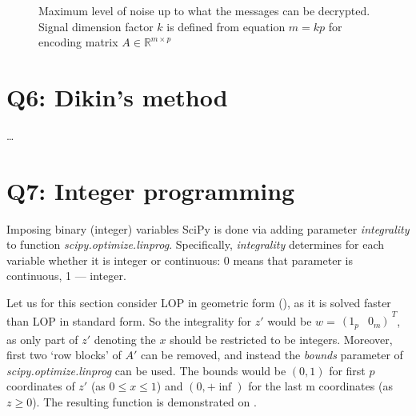 \documentclass{article}
\newcommand{\irow}[1]{%
  {\begin{smallmatrix}(\,#1\,)\end{smallmatrix}}^T
}
\def\R{\mathbb{R}}
\begin{document}
\begin{figure}[hbt]
  \centering
  \pgfplotsset{compat=1.10}
  \caption[Maximum level of noise up to what the messages can be decrypted]
  {Maximum level of noise up to what the messages can be decrypted.
    Signal dimension factor $k$ is defined from equation $m=kp$ for encoding matrix $A \in \R^{m \times p}$}\label{fig:noise}
\end{figure}

\section{Q6: Dikin's method}
\ldots

\section{Q7: Integer programming}
Imposing binary (integer) variables SciPy is done via adding parameter \textit{integrality} to function \textit{scipy.optimize.linprog}. Specifically, \textit{integrality} determines for each variable whether it is integer or continuous: 0 means that parameter is continuous, 1 --- integer.

Let us for this section consider LOP in geometric form (), as it is solved faster than LOP in standard form. So the integrality for $z'$ would be $w = \irow{1_p & 0_m}$, as only part of $z'$ denoting the $x$ should be restricted to be integers. Moreover, first two `row blocks' of $A'$ can be removed, and instead the \textit{bounds} parameter of \textit{scipy.optimize.linprog} can be used. The bounds would be $(0,1)$ for first $p$ coordinates of $z'$ (as $0 \leq x \leq 1$) and $(0, +\inf)$ for the last m coordinates (as $z \geq 0$). The resulting function is demonstrated on .
\end{document}
